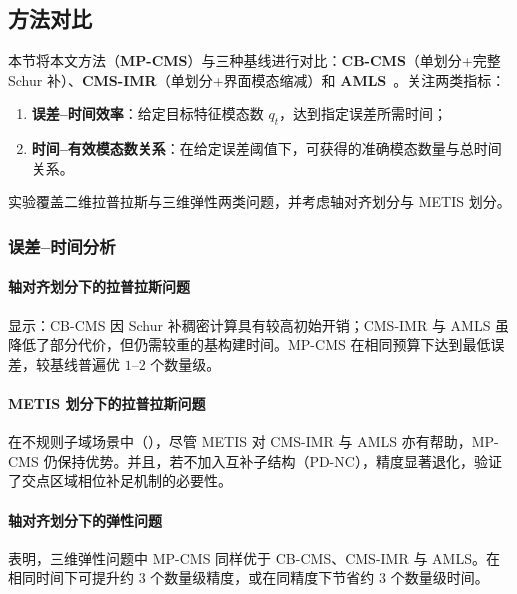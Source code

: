\subsection{方法对比}
本节将本文方法（\textbf{MP-CMS}）与三种基线进行对比：\textbf{CB-CMS}（单划分+完整 Schur 补）、\textbf{CMS-IMR}（单划分+界面模态缩减）和 \textbf{AMLS}~\cite{Gao2008AMLS}。关注两类指标：
\begin{enumerate}
  \item \textbf{误差--时间效率}：给定目标特征模态数 $q_t$，达到指定误差所需时间；
  \item \textbf{时间--有效模态数关系}：在给定误差阈值下，可获得的准确模态数量与总时间关系。
\end{enumerate}
实验覆盖二维拉普拉斯与三维弹性两类问题，并考虑轴对齐划分与 METIS 划分。

\subsubsection{误差--时间分析}
\paragraph{轴对齐划分下的拉普拉斯问题}
 显示：CB-CMS 因 Schur 补稠密计算具有较高初始开销；CMS-IMR 与 AMLS 虽降低了部分代价，但仍需较重的基构建时间。\textcolor{ConclusionEvidence}{MP-CMS 在相同预算下达到最低误差，较基线普遍优 $1$--$2$ 个数量级。}

\paragraph{METIS 划分下的拉普拉斯问题}
在不规则子域场景中（），尽管 METIS 对 CMS-IMR 与 AMLS 亦有帮助，MP-CMS 仍保持优势。并且，若不加入互补子结构（PD-NC），精度显著退化，验证了交点区域相位补足机制的必要性。

\paragraph{轴对齐划分下的弹性问题}
 表明，三维弹性问题中 MP-CMS 同样优于 CB-CMS、CMS-IMR 与 AMLS。\textcolor{ConclusionEvidence}{在相同时间下可提升约 3 个数量级精度，或在同精度下节省约 3 个数量级时间。}

